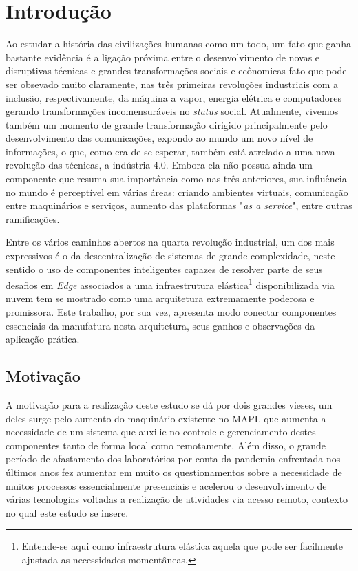 \chapter[Introdução]{Introdução}

Ao estudar a história das civilizações humanas como um todo, um fato que ganha bastante evidência é a ligação próxima 
entre o desenvolvimento de novas e disruptivas técnicas e grandes transformações sociais e ecônomicas fato que pode 
ser obsevado muito claramente, nas três primeiras revoluções industriais com a inclusão, respectivamente, da máquina 
a vapor, energia elétrica e computadores gerando transformações incomensuráveis no \textit{status} social. Atualmente,
vivemos também um momento de grande transformação dirigido principalmente pelo desenvolvimento das comunicações, expondo 
ao mundo um novo nível de informações, o que, como era de se esperar, também está atrelado a uma nova revolução das 
técnicas, a indústria 4.0. Embora ela não possua ainda um componente que resuma sua importância como nas três anteriores, 
sua influência no mundo é perceptível em várias áreas: criando ambientes virtuais, comunicação entre maquinários e serviços, aumento das 
plataformas "\textit{as a service}", entre outras ramificações.

Entre os vários caminhos abertos na quarta revolução industrial, um dos mais expressivos é o da descentralização de sistemas
de grande complexidade, neste sentido o uso de componentes inteligentes capazes de resolver parte de seus desafios em 
\textit{Edge} associados a uma infraestrutura elástica\footnote{Entende-se aqui como infraestrutura elástica aquela que 
pode ser facilmente ajustada as necessidades momentâneas.} disponibilizada via nuvem tem se mostrado como uma arquitetura 
extremamente poderosa e promissora. Este trabalho, por sua vez, apresenta modo conectar componentes essenciais da manufatura
nesta arquitetura, seus ganhos e observações da aplicação prática.


\section{Motivação}
A motivação para a realização deste estudo se dá por dois grandes vieses, um deles surge pelo aumento do maquinário 
existente no \ac{MAPL} que aumenta a necessidade de um sistema que auxilie no controle e gerenciamento destes componentes
tanto de forma local como remotamente. Além disso, o grande período de afastamento dos laboratórios por conta da 
pandemia enfrentada nos últimos anos fez aumentar em muito os questionamentos sobre a necessidade de muitos processos 
essencialmente presenciais e acelerou o desenvolvimento de várias tecnologias voltadas a realização de atividades via acesso
remoto, contexto no qual este estudo se insere.


